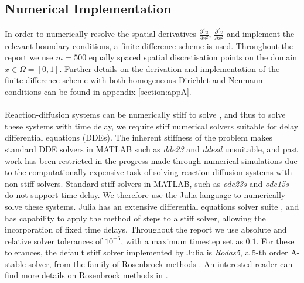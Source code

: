 \subsection{Numerical Implementation}\label{section:numimp}
In order to numerically resolve the spatial derivatives $\frac{\partial^2 u}{\partial x^2}$, $\frac{\partial^2 v}{\partial x^2}$ and implement the relevant boundary conditions, a finite-difference scheme is used. Throughout the report we use $m=500$ equally spaced spatial discretisation points on the domain $x\in\Omega=[0,1]$. Further details on the derivation and implementation of the finite difference scheme with both homogeneous Dirichlet and Neumann conditions can be found in appendix \ref{section:appA}.
\\\\
Reaction-diffusion systems can be numerically stiff to solve \cite{stiff1, william}, and thus to solve these systems with time delay, we require stiff numerical solvers suitable for delay differential equations (DDEs). The inherent stiffness of the problem makes standard DDE solvers in MATLAB such as \emph{dde23} and \emph{ddesd} unsuitable, and past work has been restricted in the progress made through numerical simulations \cite{william} due to the computationally expensive task of solving reaction-diffusion systems with non-stiff solvers. Standard stiff solvers in MATLAB, such as \emph{ode23s} and \emph{ode15s} do not support time delay. We therefore use the Julia language to numerically solve these systems. Julia has an extensive differential equations solver suite \cite{rods}, and has capability to apply the method of steps \cite{methsteps} to a stiff solver, allowing the incorporation of fixed time delays. Throughout the report we use absolute and relative solver tolerances of $10^{-6}$, with a maximum timestep set as $0.1$. For these tolerances, the default stiff solver implemented by Julia is \emph{Rodas5}, a 5-th order A-stable solver, from the family of Rosenbrock methods \cite{rodas}. An interested reader can find more details on Rosenbrock methods in \cite{rosenbrock}.

